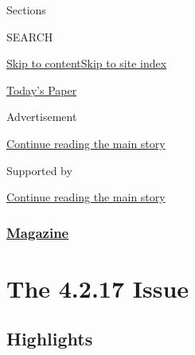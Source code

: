 Sections

SEARCH

\protect\hyperlink{site-content}{Skip to
content}\protect\hyperlink{site-index}{Skip to site index}

\href{https://myaccount.nytimes3xbfgragh.onion/auth/login?response_type=cookie\&client_id=vi}{}

\href{https://www.nytimes3xbfgragh.onion/section/todayspaper}{Today's
Paper}

Advertisement

\protect\hyperlink{after-top}{Continue reading the main story}

Supported by

\protect\hyperlink{after-sponsor}{Continue reading the main story}

\hypertarget{magazine}{%
\subsubsection{\texorpdfstring{\href{/section/magazine}{Magazine}}{Magazine}}\label{magazine}}

\hypertarget{the-4217-issue}{%
\section{The 4.2.17 Issue}\label{the-4217-issue}}

\hypertarget{highlights}{%
\subsection{Highlights}\label{highlights}}

